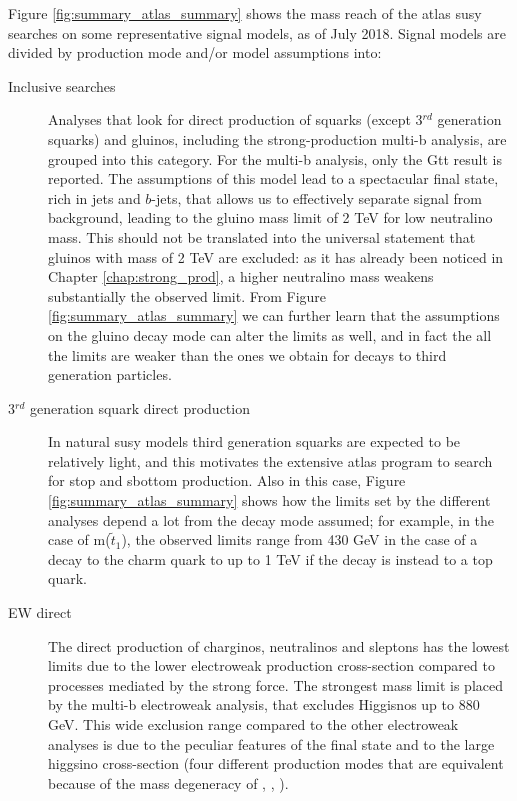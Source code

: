 Figure \ref{fig:summary_atlas_summary} shows the mass reach of the \gls{atlas} \gls{susy} searches on 
some representative signal models, as of July 2018. 
Signal models are divided by production mode and/or model assumptions into:
\begin{description}

\item[Inclusive searches] Analyses that look for direct production of squarks (except 3$^{rd}$ generation squarks)
and gluinos, including the strong-production multi-b analysis, are grouped into this category. For the multi-b analysis,
only the Gtt result is reported. The assumptions of this model lead to a spectacular final state, rich in jets and $b$-jets, that 
allows us to effectively separate signal from background, leading to the gluino mass limit of 2 TeV for low neutralino mass.
This should not be translated into the universal statement that gluinos with mass of 2 TeV are excluded: 
as it has already been noticed in Chapter \ref{chap:strong_prod}, a higher neutralino mass weakens substantially the observed limit.
From Figure \ref{fig:summary_atlas_summary} we can further learn that the assumptions on the gluino decay mode can alter the limits as well,
and in fact the all the limits are weaker than the ones we obtain for decays to third generation particles.

\item[3$^{rd}$ generation squark direct production] In natural \gls{susy} models third generation squarks are expected to be 
relatively light, and this motivates the extensive \gls{atlas} program to search for stop and sbottom production. 
Also in this case, Figure \ref{fig:summary_atlas_summary} shows how the limits set by the different analyses depend a lot from the 
decay mode assumed; for example, in the case of m($\tilde{t}_1$), the observed limits range from 430 GeV in the case of a decay 
to the charm quark to up to 1 TeV if the decay is instead to a top quark.

\item[EW direct] The direct production of charginos, neutralinos and sleptons has the lowest limits due to the lower electroweak
production cross-section compared to processes mediated by the strong force. The strongest mass limit is placed by the multi-b 
electroweak analysis, that excludes Higgisnos up to 880 GeV. This wide exclusion range compared to the other electroweak analyses
is due to the peculiar features of the final state and to the large higgsino cross-section (four different production modes that are equivalent 
because of the mass degeneracy of \ninoone, \ninotwo, \chinoonepm). 


\end{description}

